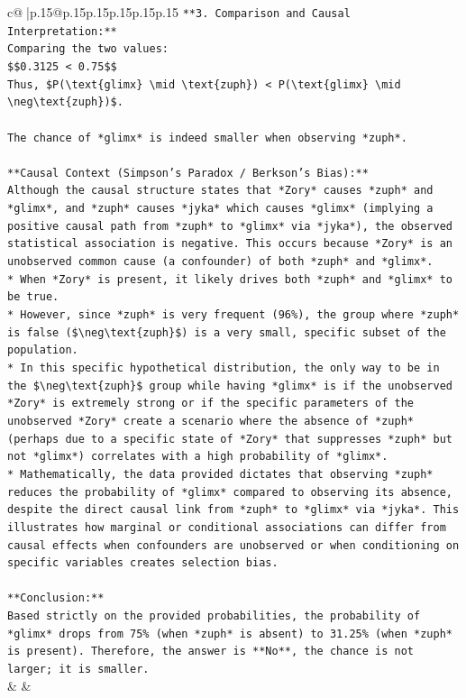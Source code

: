 \documentclass{article}
\begin{document}
{\begin{supertabular}{c@{$\;$}|p{.15\linewidth}@{}p{.15\linewidth}p{.15\linewidth}p{.15\linewidth}p{.15\linewidth}p{.15\linewidth}}
{{{\texttt{**3. Comparison and Causal Interpretation:**} \\
\texttt{Comparing the two values:} \\
\texttt{\$\$0.3125 < 0.75\$\$} \\
\texttt{Thus, \$P(\textbackslash{}text\{glimx\} \textbackslash{}mid \textbackslash{}text\{zuph\}) < P(\textbackslash{}text\{glimx\} \textbackslash{}mid \textbackslash{}neg\textbackslash{}text\{zuph\})\$.} \\
\\ 
\texttt{The chance of *glimx* is indeed smaller when observing *zuph*.} \\
\\ 
\texttt{**Causal Context (Simpson's Paradox / Berkson's Bias):**} \\
\texttt{Although the causal structure states that *Zory* causes *zuph* and *glimx*, and *zuph* causes *jyka* which causes *glimx* (implying a positive causal path from *zuph* to *glimx* via *jyka*), the observed statistical association is negative. This occurs because *Zory* is an unobserved common cause (a confounder) of both *zuph* and *glimx*.} \\
\texttt{*   When *Zory* is present, it likely drives both *zuph* and *glimx* to be true.} \\
\texttt{*   However, since *zuph* is very frequent (96\%), the group where *zuph* is false (\$\textbackslash{}neg\textbackslash{}text\{zuph\}\$) is a very small, specific subset of the population.} \\
\texttt{*   In this specific hypothetical distribution, the only way to be in the \$\textbackslash{}neg\textbackslash{}text\{zuph\}\$ group while having *glimx* is if the unobserved *Zory* is extremely strong or if the specific parameters of the unobserved *Zory* create a scenario where the absence of *zuph* (perhaps due to a specific state of *Zory* that suppresses *zuph* but not *glimx*) correlates with a high probability of *glimx*.} \\
\texttt{*   Mathematically, the data provided dictates that observing *zuph* reduces the probability of *glimx* compared to observing its absence, despite the direct causal link from *zuph* to *glimx* via *jyka*. This illustrates how marginal or conditional associations can differ from causal effects when confounders are unobserved or when conditioning on specific variables creates selection bias.} \\
\\ 
\texttt{**Conclusion:**} \\
\texttt{Based strictly on the provided probabilities, the probability of *glimx* drops from 75\% (when *zuph* is absent) to 31.25\% (when *zuph* is present). Therefore, the answer is **No**, the chance is not larger; it is smaller.} \\
            }
        }
    }
    & & \\ \\


\end{supertabular}}
\end{document}
